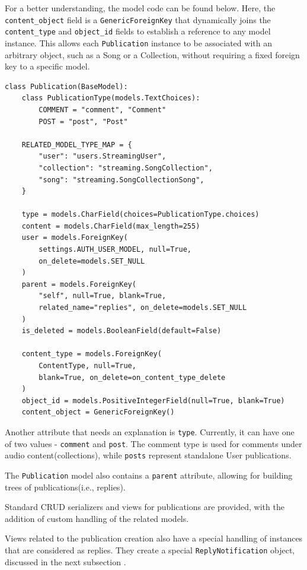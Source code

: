 For a better understanding, the model code can be found below.
Here, the \texttt{content\_object} field is a \texttt{GenericForeignKey}
that dynamically joins the \texttt{content\_type} and \texttt{object\_id}
fields to establish a reference to any model instance.
This allows each \texttt{Publication} instance to be associated with
an arbitrary object, such as a Song or a Collection, without requiring a
fixed foreign key to a specific model.

\begin{verbatim}
class Publication(BaseModel):
    class PublicationType(models.TextChoices):
        COMMENT = "comment", "Comment"
        POST = "post", "Post"

    RELATED_MODEL_TYPE_MAP = {
        "user": "users.StreamingUser",
        "collection": "streaming.SongCollection",
        "song": "streaming.SongCollectionSong",
    }

    type = models.CharField(choices=PublicationType.choices)
    content = models.CharField(max_length=255)
    user = models.ForeignKey(
        settings.AUTH_USER_MODEL, null=True,
        on_delete=models.SET_NULL
    )
    parent = models.ForeignKey(
        "self", null=True, blank=True,
        related_name="replies", on_delete=models.SET_NULL
    )
    is_deleted = models.BooleanField(default=False)

    content_type = models.ForeignKey(
        ContentType, null=True,
        blank=True, on_delete=on_content_type_delete
    )
    object_id = models.PositiveIntegerField(null=True, blank=True)
    content_object = GenericForeignKey()
\end{verbatim}

Another attribute that needs an explanation is \texttt{type}.
Currently, it can have one of two values - \texttt{comment} and \texttt{post}.
The comment type is used for comments under audio content(collections),
while \texttt{posts} represent standalone User publications.

The \texttt{Publication} model also contains a \texttt{parent} attribute, allowing for
building trees of publications(i.e., replies).

Standard CRUD serializers and views for publications are provided,
with the addition of custom handling of the related models.

Views related to the publication creation also have a special handling
of instances that are considered as replies. They create a special
\texttt{ReplyNotification} object, discussed in the next subsection .

